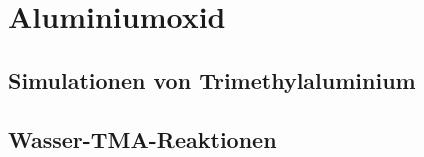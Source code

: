 \chapter{Aluminiumoxid}
\label{appendix_alumina}

\section{Simulationen von Trimethylaluminium}


\section{Wasser-TMA-Reaktionen}


